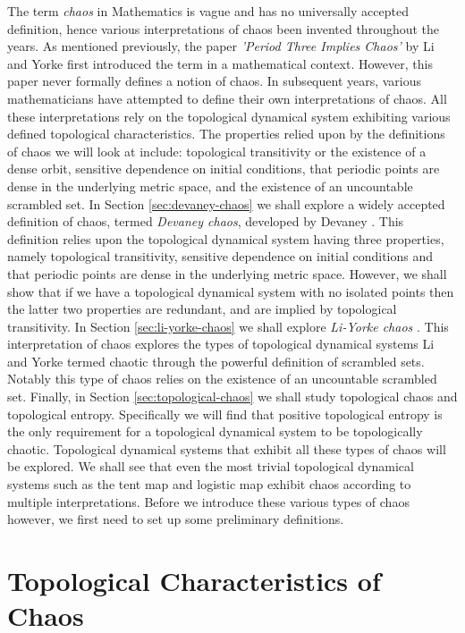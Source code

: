 The term \emph{chaos} in Mathematics is vague and has no universally accepted definition, hence various interpretations of chaos been invented throughout the years. As mentioned previously, the paper \emph{'Period Three Implies Chaos'} by Li and Yorke \cite{li-yorke} first introduced the term in a mathematical context. However, this paper never formally defines a notion of chaos. In subsequent years, various mathematicians have attempted to define their own interpretations of chaos. All these interpretations rely on the topological dynamical system exhibiting various defined topological characteristics. The properties relied upon by the definitions of chaos we will look at include: topological transitivity or the existence of a dense orbit, sensitive dependence on initial conditions, that periodic points are dense in the underlying metric space, and the existence of an uncountable scrambled set. In Section \ref{sec:devaney-chaos} we shall explore a widely accepted definition of chaos, termed \emph{Devaney chaos}, developed by Devaney \cite{devaney}. This definition relies upon the topological dynamical system having three properties, namely topological transitivity, sensitive dependence on initial conditions and that periodic points are dense in the underlying metric space. However, we shall show that if we have a topological dynamical system with no isolated points then the latter two properties are redundant, and are implied by topological transitivity. In Section \ref{sec:li-yorke-chaos} we shall explore \emph{Li-Yorke chaos} \cite{li-yorke}. This interpretation of chaos explores the types of topological dynamical systems Li and Yorke termed chaotic through the powerful definition of scrambled sets. Notably this type of chaos relies on the existence of an uncountable scrambled set. Finally, in Section \ref{sec:topological-chaos} we shall study topological chaos and topological entropy. Specifically we will find that positive topological entropy is the only requirement for a topological dynamical system to be topologically chaotic. Topological dynamical systems that exhibit all these types of chaos will be explored. We shall see that even the most trivial topological dynamical systems such as the tent map and logistic map exhibit chaos according to multiple interpretations. Before we introduce these various types of chaos however, we first need to set up some preliminary definitions.

\section{Topological Characteristics of Chaos} \label{sec:characteristics-of-chaos}

